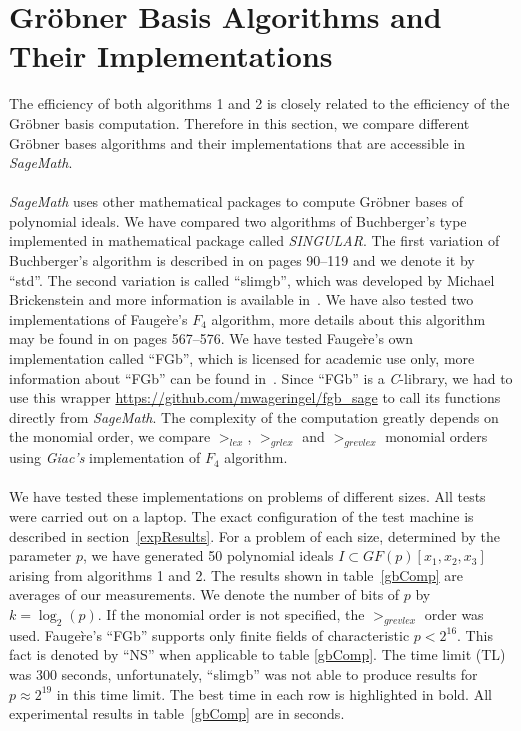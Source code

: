 \documentclass[thesis=M,english]{FITthesis}[2012/10/20]
\theoremstyle{remark}
\theoremstyle{definition}
\begin{document}
\section{Gröbner Basis Algorithms and Their Implementations}
The efficiency of both algorithms 1 and 2 is closely related to the efficiency of the Gröbner basis computation. Therefore in this section, we compare different Gröbner bases algorithms and their implementations that are accessible in \textit{SageMath}. \\\\
\noindent \textit{SageMath} uses other mathematical packages to compute Gröbner bases of polynomial ideals. We have compared two algorithms of Buchberger's type implemented in mathematical package called \textit{SINGULAR}. The first variation of Buchberger's algorithm is described in \cite{algGeom} on pages 90--119 and we denote it by \enquote{std}. The second variation is called \enquote{slimgb}, which was developed by Michael Brickenstein and more information is available in~\cite{brick}. We have also tested two implementations of Fauge\`re's $F_4$ algorithm, more details about this algorithm may be found in \cite{algGeom} on pages 567--576. We have tested Fauge\`re's own implementation called \enquote{FGb}, which is licensed for academic use only, more information about \enquote{FGb} can be found in~\cite{fgb}. Since \enquote{FGb} is a \textit{C}-library, we had to use this wrapper \url{https://github.com/mwageringel/fgb_sage} to call its functions directly from \textit{SageMath}. The complexity of the computation greatly depends on the monomial order, we compare $>_{lex}$, $>_{grlex}$ and $>_{grevlex}$ monomial orders using \textit{Giac's} implementation of $F_4$ algorithm.
\\ \\
\noindent We have tested these implementations on problems of different sizes. All tests were carried out on a laptop. The exact configuration of the test machine is described in section~\ref{expResults}. For a problem of each size, determined by the parameter $p$, we have generated 50 polynomial ideals $I \subset GF(p)[x_1,x_2,x_3]$ arising from algorithms 1 and 2. The results shown in table~\ref{gbComp} are averages of our measurements. We denote the number of bits of $p$ by $k =\log_2(p)$. If the monomial order is not specified, the $>_{grevlex}$ order was used. Fauge\`re's \enquote{FGb} supports only finite fields of characteristic $p < 2^{16}$. This fact is denoted by \enquote{NS} when applicable to table \ref{gbComp}. The time limit (TL) was 300 seconds, unfortunately, \enquote{slimgb} was not able to produce results for $p \approx 2^{19}$ in this time limit. The best time in each row is highlighted in bold. All experimental results in table~\ref{gbComp} are in seconds. 
\end{document}
